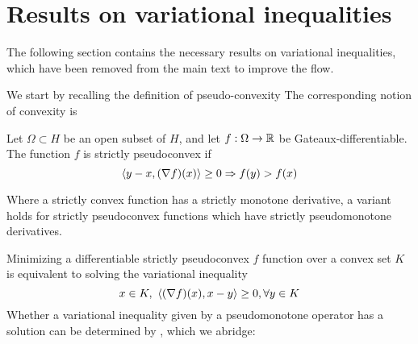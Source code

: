 \section{Results on variational inequalities}
\label{sec:appendix}
The following section contains the necessary results on variational inequalities, which have been removed from the main text to improve the flow.

We start by recalling the definition of pseudo-convexity
The corresponding notion of convexity is
\begin{definition}
  Let $\Omega \subset H$ be an open subset of $H$, and let $f:\Omega \to \mathbb{R}$ be Gateaux-differentiable. The function $f$ is strictly pseudoconvex if
  \begin{equation}
    \left \langle y-x,(\nabla f)(x) \right \rangle \geq 0 \Rightarrow f(y) > f(x)
  \end{equation}
\end{definition}
Where a strictly convex function has a strictly monotone derivative, a variant holds for strictly pseudoconvex functions which have strictly pseudomonotone derivatives. %
\begin{comment}
Proving strict pseudomonotonicity in itself can be hard, but thankfully the notions of strict pseudomonotonicity and strict pseudoconvexity are related.
\begin{theorem}[Theorem 12.13, p. 521 \citep{hadjisavvas2006handbook}]
  Let $\Omega \subset H$ be an open convex subset, and let $f:\Omega \to \R$ be Gateaux differentiable. Then $f$ is strictly pseudoconvex if and only if $\nabla f$ is strictly pseudomonotone.
\end{theorem}
\end{comment}
Minimizing a differentiable strictly pseudoconvex $f$ function over a convex set $K$ is equivalent to solving the variational inequality \citep[P. 521]{hadjisavvas2006handbook}
\begin{equation}
  \label{eq:min_func}
  x \in K, ~ \left \langle (\nabla f)(x),x-y \right \rangle \geq 0, \forall y\in K
\end{equation}
Whether a variational inequality given by a pseudomonotone operator has a solution can be determined by \citep[Theorem 3.4]{maugeri2009existence}, which we abridge:
